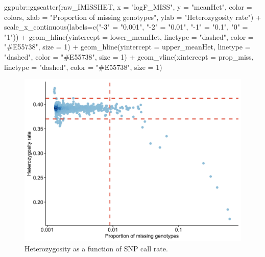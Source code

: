 \documentclass[
]{book}
\newenvironment{Shaded}{\begin{snugshade}}{\end{snugshade}}
\newcommand{\AttributeTok}[1]{\textcolor[rgb]{0.77,0.63,0.00}{#1}}
\newcommand{\DecValTok}[1]{\textcolor[rgb]{0.00,0.00,0.81}{#1}}
\newcommand{\FunctionTok}[1]{\textcolor[rgb]{0.00,0.00,0.00}{#1}}
\newcommand{\NormalTok}[1]{#1}
\newcommand{\OtherTok}[1]{\textcolor[rgb]{0.56,0.35,0.01}{#1}}
\newcommand{\SpecialCharTok}[1]{\textcolor[rgb]{0.00,0.00,0.00}{#1}}
\newcommand{\StringTok}[1]{\textcolor[rgb]{0.31,0.60,0.02}{#1}}
\begin{document}
\begin{Shaded}
\begin{Highlighting}[]
\NormalTok{ggpubr}\SpecialCharTok{::}\FunctionTok{ggscatter}\NormalTok{(raw\_IMISSHET, }\AttributeTok{x =} \StringTok{"logF\_MISS"}\NormalTok{, }\AttributeTok{y =} \StringTok{"meanHet"}\NormalTok{,}
                  \AttributeTok{color =}\NormalTok{ colors,}
                  \AttributeTok{xlab =} \StringTok{"Proportion of missing genotypes"}\NormalTok{, }\AttributeTok{ylab =} \StringTok{"Heterozygosity rate"}\NormalTok{) }\SpecialCharTok{+}
  \FunctionTok{scale\_x\_continuous}\NormalTok{(}\AttributeTok{labels=}\FunctionTok{c}\NormalTok{(}\StringTok{"{-}3"} \OtherTok{=} \StringTok{"0.001"}\NormalTok{, }\StringTok{"{-}2"} \OtherTok{=} \StringTok{"0.01"}\NormalTok{,}
                              \StringTok{"{-}1"} \OtherTok{=} \StringTok{"0.1"}\NormalTok{, }\StringTok{"0"} \OtherTok{=} \StringTok{"1"}\NormalTok{)) }\SpecialCharTok{+}
  \FunctionTok{geom\_hline}\NormalTok{(}\AttributeTok{yintercept =}\NormalTok{ lower\_meanHet, }\AttributeTok{linetype =} \StringTok{"dashed"}\NormalTok{,}
                \AttributeTok{color =} \StringTok{"\#E55738"}\NormalTok{, }\AttributeTok{size =} \DecValTok{1}\NormalTok{) }\SpecialCharTok{+}
  \FunctionTok{geom\_hline}\NormalTok{(}\AttributeTok{yintercept =}\NormalTok{ upper\_meanHet, }\AttributeTok{linetype =} \StringTok{"dashed"}\NormalTok{,}
                \AttributeTok{color =} \StringTok{"\#E55738"}\NormalTok{, }\AttributeTok{size =} \DecValTok{1}\NormalTok{) }\SpecialCharTok{+}
  \FunctionTok{geom\_vline}\NormalTok{(}\AttributeTok{xintercept =}\NormalTok{ prop\_miss, }\AttributeTok{linetype =} \StringTok{"dashed"}\NormalTok{,}
                \AttributeTok{color =} \StringTok{"\#E55738"}\NormalTok{, }\AttributeTok{size =} \DecValTok{1}\NormalTok{)}
\end{Highlighting}
\end{Shaded}

\begin{figure}

{\centering \includegraphics[width=18.67in]{img/_gwas/show-heterozygosity} 

}

\caption{Heterozygosity as a function of SNP call rate.}\label{fig:show-heterozygosity}
\end{figure}
\end{document}
